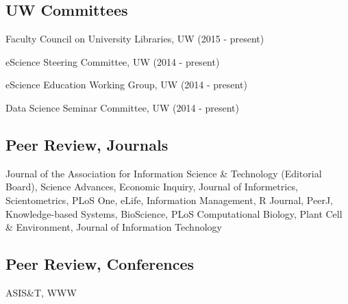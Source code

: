 \documentclass[11pt]{article}
\renewenvironment{itemize}{
  \begin{list}{}{
    \setlength{\leftmargin}{1.5em}
  }
}{
  \end{list}
}
\begin{document}
\subsection*{UW Committees}
\begin{itemize}
\item Faculty Council on University Libraries, UW (2015 - present)
\item eScience Steering Committee, UW (2014 - present)
\item eScience Education Working Group, UW (2014 - present)
\item Data Science Seminar Committee, UW (2014 - present) 
\end{itemize}



\subsection*{Peer Review, Journals}
Journal of the Association for Information Science \& Technology (Editorial Board), Science Advances, Economic Inquiry, Journal of Informetrics, Scientometrics, PLoS One, eLife, Information Management, R Journal, PeerJ, Knowledge-based Systems, BioScience, PLoS Computational Biology, Plant Cell \& Environment, Journal of Information Technology  

\subsection*{Peer Review, Conferences}
ASIS\&T, WWW 







\end{document}
